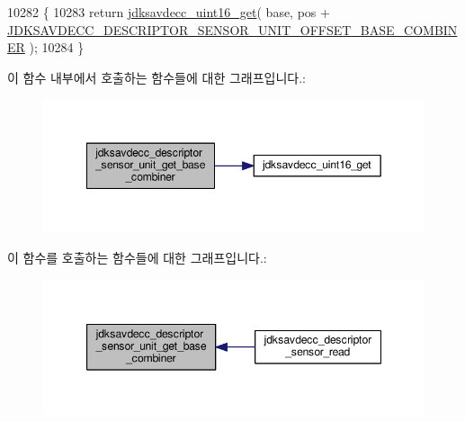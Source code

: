 \begin{DoxyCode}
10282 \{
10283     \textcolor{keywordflow}{return} \hyperlink{group__endian_ga3fbbbc20be954aa61e039872965b0dc9}{jdksavdecc\_uint16\_get}( base, pos + 
      \hyperlink{group__descriptor__sensor_gaffbc47d9fab9b1b8f8d3a8960417396e}{JDKSAVDECC\_DESCRIPTOR\_SENSOR\_UNIT\_OFFSET\_BASE\_COMBINER}
       );
10284 \}
\end{DoxyCode}


이 함수 내부에서 호출하는 함수들에 대한 그래프입니다.\+:
\nopagebreak
\begin{figure}[H]
\begin{center}
\leavevmode
\includegraphics[width=349pt]{group__descriptor__sensor_ga7edab4d075ad5b612ee5bb7013d329bd_cgraph}
\end{center}
\end{figure}




이 함수를 호출하는 함수들에 대한 그래프입니다.\+:
\nopagebreak
\begin{figure}[H]
\begin{center}
\leavevmode
\includegraphics[width=347pt]{group__descriptor__sensor_ga7edab4d075ad5b612ee5bb7013d329bd_icgraph}
\end{center}
\end{figure}


